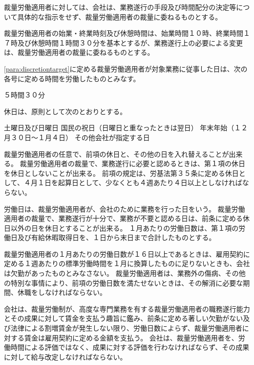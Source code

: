 \documentclass[10pt,a4paper]{jsarticle}
\begin{document}
裁量労働適用者に対しては、会社は、業務遂行の手段及び時間配分の決定等について具体的な指示をせず、裁量労働適用者の裁量に委ねるものとする。

裁量労働適用者の始業・終業時刻及び休憩時間は、始業時間１０時、終業時間１７時及び休憩時間１時間３０分を基本とするが、業務遂行上の必要による変更は、裁量労働適用者の裁量に委ねるものとする。

\ref{para:discretiontarget}に定める裁量労働適用者が対象業務に従事した日は、次の各号に定める時間を労働したものとみなす。
\begin{enumerate}
    \itm ５時間３０分
\end{enumerate}

休日は、原則として次のとおりとする。
\begin{enumerate}
    \itm 土曜日及び日曜日
    \itm 国民の祝日（日曜日と重なったときは翌日）
    \itm 年末年始（１２月３０日〜１月４日）
    \itm その他会社が指定する日
\end{enumerate}
\term 裁量労働適用者の任意で、前項の休日と、その他の日を入れ替えることが出来る。
\term 裁量労働適用者の裁量で、業務遂行に必要と認めるときは、第１項の休日を休日としないことが出来る。
\term 前項の規定は、労基法第３５条に定める休日として、４月１日を起算日として、少なくとも４週あたり４日以上としなければならない。


労働日は、裁量労働適用者が、会社のために業務を行った日をいう。
\term 裁量労働適用者の裁量で、業務遂行が十分で、業務が不要と認める日は、前条に定める休日以外の日を休日とすることが出来る。
\term １月あたりの労働日数は、第１項の労働日及び有給休暇取得日を、１日から末日まで合計したものとする。

裁量労働適用者の１月あたりの労働日数が１６日以上であるときは、雇用契約に定める１週あたりの標準労働時間を１月に換算したものに足りないときも、会社は欠勤があったものとみなさない。
\term 裁量労働適用者は、業務外の傷病、その他の特別な事情により、前項の労働日数を満たせないときは、その解消に必要な期間、休職をしなければならない。

会社は、裁量労働制が、高度な専門業務を有する裁量労働適用者の職務遂行能力とその成果に対して賃金を支払う趣旨に鑑み、前条に定める著しい欠勤がない及び法律による割増賃金が発生しない限り、労働日数によらず、裁量労働適用者に対する賃金は雇用契約に定める金額を支払う。
\term 会社は、裁量労働適用者を、労働時間による評価ではなく、成果に対する評価を行わなければならず、その成果に対して給与改定しなければならない。
\end{document}

